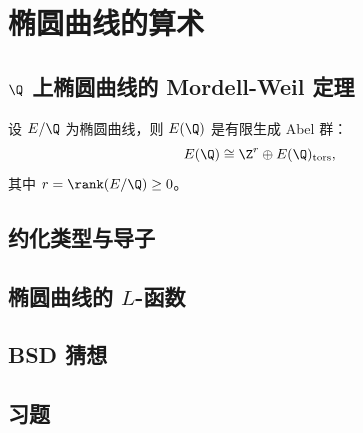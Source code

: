 \chapter{椭圆曲线的算术}
\label{ch:elliptic-curve-arithmetic}

\section{$\Q$ 上椭圆曲线的 Mordell-Weil 定理}

\begin{theorem}
设 $E/\Q$ 为椭圆曲线，则 $E(\Q)$ 是有限生成 Abel 群：
\[
  E(\Q) \cong \Z^r \oplus E(\Q)_{\mathrm{tors}},
\]
其中 $r = \rank(E/\Q) \geq 0$。
\end{theorem}


\section{约化类型与导子}


\section{椭圆曲线的 $L$-函数}


\section{BSD 猜想}


\section{习题}
